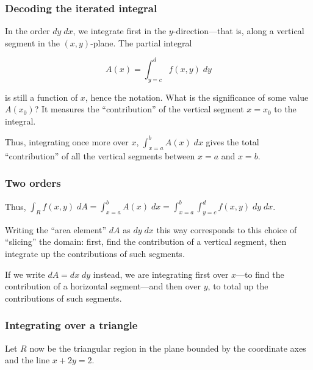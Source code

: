 \documentclass[11pt,ignorenonframetext,aspectratio=169,xcolor={svgnames}]{beamer}
\begin{document}
\begin{frame}\frametitle{Decoding the iterated integral}

In the order $dy \; dx$, we integrate first in the $y$-direction---that
is, along a vertical segment in the $(x,y)$-plane. The partial integral

\[ A(x) = \int_{y = c}^d f(x,y) \; dy \]

is still a function of $x$, hence the notation. What is the significance
of some value $A(x_0)$? It measures the ``contribution'' of the vertical
segment $x=x_0$ to the integral.

Thus, integrating once more over $x$, $\int_{x=a}^b A(x) \; dx$ gives
the total ``contribution'' of all the vertical segments between $x=a$
and $x=b$.

\end{frame}

\begin{frame}\frametitle{Two orders}

Thus,
$\int_R f(x,y) \; dA = \int_{x=a}^b A(x) \; dx = \int_{x=a}^b \int_{y=c}^d f(x,y) \; dy \; dx$.

Writing the ``area element'' $dA$ as $dy \; dx$ this way corresponds to
this choice of ``slicing'' the domain: first, find the contribution of a
vertical segment, then integrate up the contributions of such segments.

If we write $dA = dx \; dy$ instead, we are integrating first over
$x$---to find the contribution of a horizontal segment---and then over
$y$, to total up the contributions of such segments.

\end{frame}

\begin{frame}\frametitle{Integrating over a triangle}

Let $R$ now be the triangular region in the plane bounded by the
coordinate axes and the line $x + 2y = 2$.

\end{frame}
\end{document}
